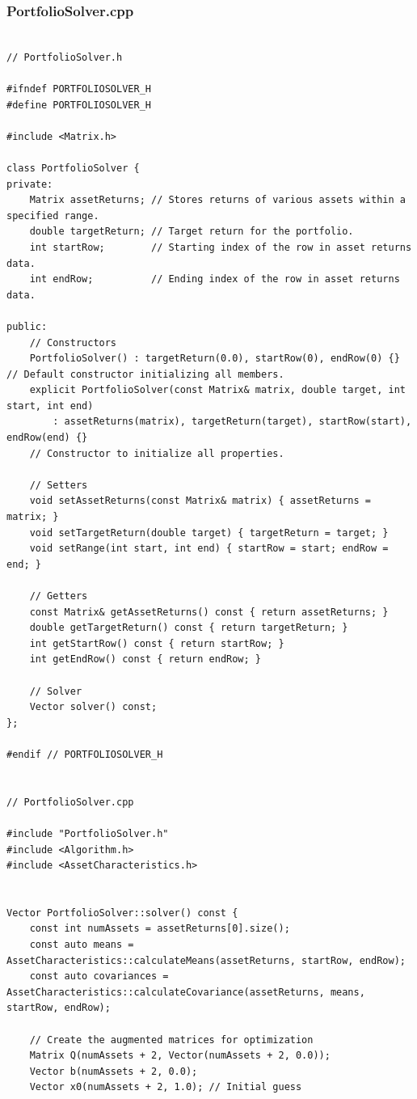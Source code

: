 \documentclass[12pt,twoside]{article}
\begin{document}
\subsubsection{PortfolioSolver.cpp}
\scriptsize
\begin{verbatim}

// PortfolioSolver.h

#ifndef PORTFOLIOSOLVER_H
#define PORTFOLIOSOLVER_H

#include <Matrix.h>

class PortfolioSolver {
private:
    Matrix assetReturns; // Stores returns of various assets within a specified range.
    double targetReturn; // Target return for the portfolio.
    int startRow;        // Starting index of the row in asset returns data.
    int endRow;          // Ending index of the row in asset returns data.

public:
    // Constructors
    PortfolioSolver() : targetReturn(0.0), startRow(0), endRow(0) {} // Default constructor initializing all members.
    explicit PortfolioSolver(const Matrix& matrix, double target, int start, int end)
        : assetReturns(matrix), targetReturn(target), startRow(start), endRow(end) {}
    // Constructor to initialize all properties.

    // Setters
    void setAssetReturns(const Matrix& matrix) { assetReturns = matrix; }
    void setTargetReturn(double target) { targetReturn = target; }
    void setRange(int start, int end) { startRow = start; endRow = end; }

    // Getters
    const Matrix& getAssetReturns() const { return assetReturns; }
    double getTargetReturn() const { return targetReturn; }
    int getStartRow() const { return startRow; }
    int getEndRow() const { return endRow; }

    // Solver
    Vector solver() const;
};

#endif // PORTFOLIOSOLVER_H


// PortfolioSolver.cpp

#include "PortfolioSolver.h"
#include <Algorithm.h>
#include <AssetCharacteristics.h>


Vector PortfolioSolver::solver() const {
    const int numAssets = assetReturns[0].size();
    const auto means = AssetCharacteristics::calculateMeans(assetReturns, startRow, endRow);
    const auto covariances = AssetCharacteristics::calculateCovariance(assetReturns, means, startRow, endRow);

    // Create the augmented matrices for optimization
    Matrix Q(numAssets + 2, Vector(numAssets + 2, 0.0));
    Vector b(numAssets + 2, 0.0);
    Vector x0(numAssets + 2, 1.0); // Initial guess


\end{verbatim}
\end{document}
